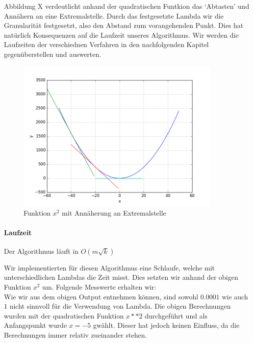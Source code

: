 \documentclass[10pt]{article}         %
\begin{document}
Abbildung X verdeutlicht anhand der quadratischen Funtkion das `Abtasten' und Annähern an eine Extremalstelle. Durch das festgesetzte Lambda wir die Granularität festgesetzt, also den Abstand zum vorangehenden Punkt. Dies hat natürlich Konsequenzen auf die Laufzeit unseres Algorithmus. Wir werden die Laufzeiten der verschiednen Verfahren in den nachfolgenden Kapitel gegenüberstellen und auswerten. 

\begin{figure}[!ht]
    \centering
    \includegraphics[width=0.9\textwidth]{gradient}
    \caption{Funktion $x^2$ mit Annäherung an Extremalstelle}\label{gradientx}
\end{figure}

\paragraph{Laufzeit}
Der Algorithmus läuft in $O(m\sqrt{k})$

Wir implementierten für diesen Algorithmus eine Schlaufe, welche mit unterschiedlichen Lambdas die Zeit misst. Dies setzten wir anhand der obigen Funktion $x^2$ um. Folgende Messwerte erhalten wir:\\




Wie wir aus dem obigen Output entnehmen können, sind sowohl $0.0001$ wie auch $1$ nicht sinnvoll für die Verwendung von Lambda. Die obigen Berechnungen wurden mit der quadratischen Funktion $x**2$ durchgeführt und als Anfangspunkt wurde $x=-5$ gwählt. Dieser hat jedoch keinen Einfluss, da die Berechnungen immer relativ zueinander stehen. 
\end{document}

